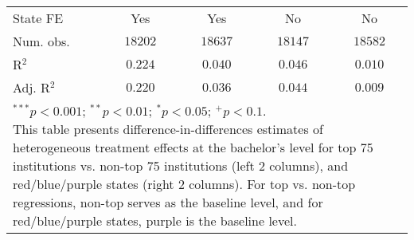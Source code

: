 \begin{table}
\begin{center}
\begin{tabular}{l c c c c}
State FE                                     & Yes       & Yes           & No            & No            \\
Num. obs.                                    & $18202$   & $18637$       & $18147$       & $18582$       \\
R$^2$                           & $0.224$   & $0.040$       & $0.046$       & $0.010$       \\
Adj. R$^2$                      & $0.220$   & $0.036$       & $0.044$       & $0.009$       \\
\bottomrule
\multicolumn{5}{l}{\scriptsize{\parbox{1\linewidth}{\vspace{2pt}$^{***}p<0.001$; $^{**}p<0.01$; $^{*}p<0.05$; $^{+}p<0.1$. \\
                      This table presents difference-in-differences estimates of heterogeneous treatment effects at the bachelor's level for top 75 institutions vs. non-top 75 institutions (left 2 columns), and red/blue/purple states (right 2 columns). For top vs. non-top regressions, non-top serves as the baseline level, and for red/blue/purple states, purple is the baseline level.}}}
\end{tabular}
\label{table:coefficients}
\end{center}
\end{table}


